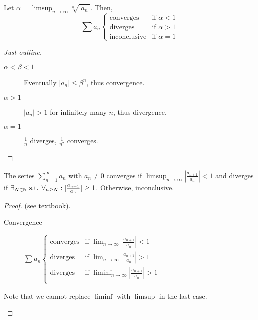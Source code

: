 \begin{theorem}
	\label{thm:3.33}
	Let $\alpha=\limsup_{n\to \infty}{\sqrt[n]{|a_n|}}$. Then,
	\[
		\sum{a_{n}}
		\begin{cases}
			\text{converges}    & \text{if } \alpha<1 \\
			\text{diverges}     & \text{if } \alpha>1 \\
			\text{inconclusive} & \text{if } \alpha=1
		\end{cases}
	\]

	\begin{proof}[Just outline]
		\begin{description}
			\item[$\alpha< \beta < 1$]
			      Eventually $|a_n|\le \beta^{n}$, thus convergence.
			\item[$\alpha > 1$]
			      $|a_{n}|>1$ for infinitely many $n$, thus divergence.
			\item[$\alpha=1$]
			      $\frac{1}{n}$ diverges, $\frac{1}{n^2}$ converges.
		\end{description}
	\end{proof}
\end{theorem}
\begin{theorem}
	\label{thm:3.34}
	The series $\sum_{n=1}^{\infty}{a_{n}}$ with $a_{n}\neq 0$ converges if $\limsup_{n\to \infty}{|\frac{a_{n+1}}{a_{n}}|}<1$ and diverges if $\exists_{N \in \mathbb{N}} \text{ s.t. } \forall_{n \ge  N}:  |\frac{a_{n+1}}{a_{n}}|\ge 1 $. Otherwise, inconclusive.
	\begin{proof}
		(see textbook).\\
		\begin{description}
			\item[Convergence]
			      $\sum_{}{a_{n}}
				      \begin{cases}
					      \text{converges} & \text{if } \lim_{n\to \infty}{|\frac{a_{n+1}}{a_{n}}|}<1    \\
					      \text{diverges}  & \text{if } \lim_{n\to \infty}{|\frac{a_{n+1}}{a_{n}}|}>1    \\
					      \text{diverges}  & \text{if } \liminf_{n\to \infty}{|\frac{a_{n+1}}{a_{n}}|}>1 \\
				      \end{cases}
			      $
		\end{description}
		\begin{note}
			Note that we cannot replace $\liminf$ with $\limsup$ in the last case.
		\end{note}

	\end{proof}

\end{theorem}


